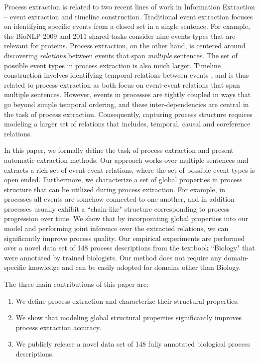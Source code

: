 Process extraction is related to two recent lines of work in Information Extraction -- event extraction and timeline construction.
Traditional event extraction focuses on identifying specific events from a closed set in a single sentence. 
For example, the BioNLP 2009 and 2011 shared tasks \cite{kim09,kim11} consider nine events types that are relevant for proteins.
Process extraction, on the other hand, is centered around discovering \emph{relations} between events that span \emph{multiple} sentences. The set of possible event types in process extraction is also much larger. Timeline construction involves identifying temporal relations between events \cite{Chambers08,Yoshikawa09,Denis11,Do12,Mcclosky12}, and is thus related to process extraction as both focus on event-event relations that span multiple sentences. However, events in processes are tightly coupled in ways that go beyond simple temporal ordering, and these inter-dependencies are central in the task of process extraction. Consequently, capturing process structure requires modeling a larger set of relations that includes, temporal, causal and coreference relations.


In this paper, we formally define the task of process extraction and present automatic extraction methods. 
Our approach works over multiple sentences and extracts a rich set of event-event relations, where the set of possible event types is open ended. 
Furthermore, we characterize a set of global properties in process structure that can be utilized during process extraction. 
For example, in processes all events are somehow connected to one another, and in addition processes usually exhibit a ``chain-like" structure corresponding to process progression over time. 
We show that by incorporating global properties into our model and performing joint inference over the extracted relations, we can significantly improve process quality.  
Our empirical experiments are performed over a novel data set of 148 process descriptions from the textbook ``Biology" \cite{CampbellReece} that were annotated by trained biologists. Our method does not require any domain-specific knowledge and can be easily adopted for domains other than Biology.

The three main contributions of this paper are:
\begin{enumerate}[itemsep=0pt,topsep=0pt] 
\item We define process extraction and characterize their structural properties.
\item We show that modeling global structural properties significantly improves process extraction accuracy.
\item  We publicly release a novel data set of 148 fully annotated biological process descriptions.
\end{enumerate}
